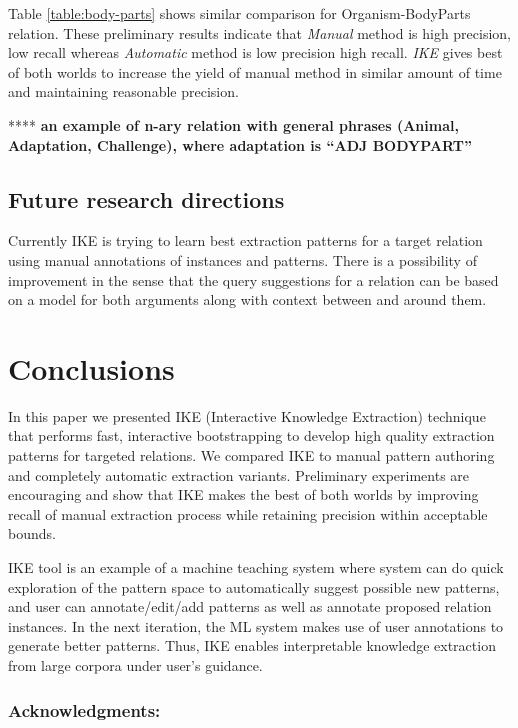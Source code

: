 \documentclass[11pt,letterpaper]{article}
\begin{document}
Table \ref{table:body-parts} shows similar comparison for Organism-BodyParts relation. These preliminary results indicate that \emph{Manual} method is high precision, low recall whereas \emph{Automatic} method is low precision high recall. \emph{IKE} gives best of both worlds to increase the yield of manual method
in similar amount of time and maintaining reasonable precision.

**** \textbf{an example of n-ary relation with general phrases (Animal, Adaptation, Challenge), where adaptation is ``ADJ BODYPART''}


\subsection*{Future research directions}
Currently IKE is trying to learn best extraction patterns for a target relation using manual annotations of instances and patterns. There is a possibility of improvement in the sense that the query suggestions for a relation can be based on a model for both arguments along with context between and around them. 

\section{Conclusions}  \label{sect:conclusions}
In this paper we presented IKE (Interactive Knowledge Extraction) technique that performs fast, interactive bootstrapping to develop high quality extraction patterns for targeted relations. We compared IKE to manual pattern authoring and completely automatic extraction variants. Preliminary experiments are encouraging and show that IKE makes the best of both worlds by improving recall of manual extraction process while retaining precision within acceptable bounds.

IKE tool is an example of a machine teaching system where system can do quick exploration of the pattern space to automatically suggest possible new patterns, and user can annotate/edit/add patterns as well as annotate proposed relation instances. In the next iteration, the ML system makes use of user annotations to generate better patterns. Thus, IKE enables interpretable knowledge extraction from large corpora under user's guidance.




\subsubsection*{Acknowledgments:} 



\end{document}
